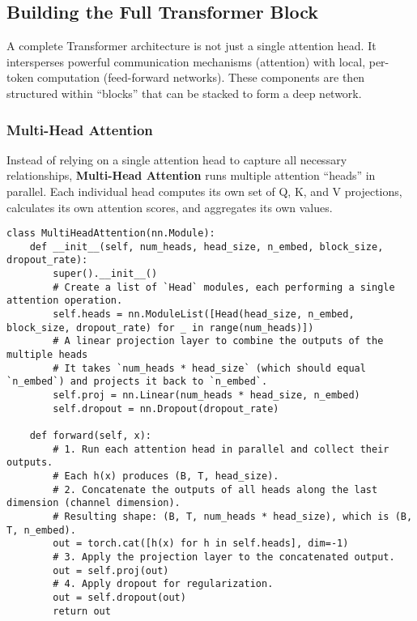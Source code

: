 \subsection{Building the Full Transformer Block}

A complete Transformer architecture is not just a single attention head. It intersperses powerful communication mechanisms (attention) with local, per-token computation (feed-forward networks). These components are then structured within ``blocks'' that can be stacked to form a deep network.

\subsubsection{Multi-Head Attention}

Instead of relying on a single attention head to capture all necessary relationships, \textbf{Multi-Head Attention} runs multiple attention ``heads'' in parallel. Each individual head computes its own set of Q, K, and V projections, calculates its own attention scores, and aggregates its own values.

\begin{lstlisting}[caption={MultiHeadAttention implementation}]
class MultiHeadAttention(nn.Module):
    def __init__(self, num_heads, head_size, n_embed, block_size, dropout_rate):
        super().__init__()
        # Create a list of `Head` modules, each performing a single attention operation.
        self.heads = nn.ModuleList([Head(head_size, n_embed, block_size, dropout_rate) for _ in range(num_heads)])
        # A linear projection layer to combine the outputs of the multiple heads
        # It takes `num_heads * head_size` (which should equal `n_embed`) and projects it back to `n_embed`.
        self.proj = nn.Linear(num_heads * head_size, n_embed) 
        self.dropout = nn.Dropout(dropout_rate)

    def forward(self, x):
        # 1. Run each attention head in parallel and collect their outputs.
        # Each h(x) produces (B, T, head_size).
        # 2. Concatenate the outputs of all heads along the last dimension (channel dimension).
        # Resulting shape: (B, T, num_heads * head_size), which is (B, T, n_embed).
        out = torch.cat([h(x) for h in self.heads], dim=-1) 
        # 3. Apply the projection layer to the concatenated output.
        out = self.proj(out)
        # 4. Apply dropout for regularization.
        out = self.dropout(out)
        return out
\end{lstlisting}

